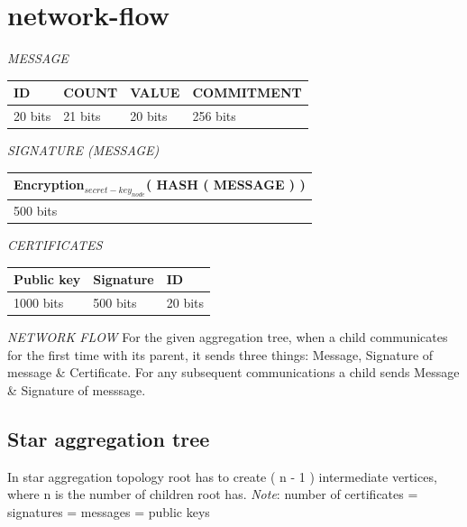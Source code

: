 \chapter{network-flow}

	\textit{MESSAGE}
	\newline
	
	\begin{tabular}{ | l | l | l | l |}
		\hline
		ID & COUNT & VALUE & COMMITMENT \\
		\hline
		20 bits & 21 bits & 20 bits & 256 bits\\
		\hline
	\end{tabular}
	\newline
	\newline
	\textit{SIGNATURE (MESSAGE)}
	\newline

	\begin{tabular}{ |l| }
		\hline
		Encryption$_{secret-key_{node}}$( HASH ( MESSAGE ) )\\
		\hline
		500 bits\\
		\hline
	\end{tabular}
	\newline
	\newline
	\textit{CERTIFICATES}
	\newline

	\begin{tabular}{ | l | l | l | }
		\hline
			Public key  & Signature & ID \\
		\hline
			1000 bits & 500 bits & 20 bits \\
		\hline

	\end{tabular}
	\newline
	\newline
	\textit{NETWORK FLOW}
	\newline
	For the given aggregation tree, when a child communicates for the first time with its parent, it sends three things: Message, Signature of message \& Certificate. For any subsequent communications a child sends Message \& Signature of messsage. 

	\section{Star aggregation tree}

		In star aggregation topology root has to create ( n - 1 ) intermediate vertices, where n is the number of children root has.
		\textit{Note}: number of certificates = signatures = messages = public keys 	
	
